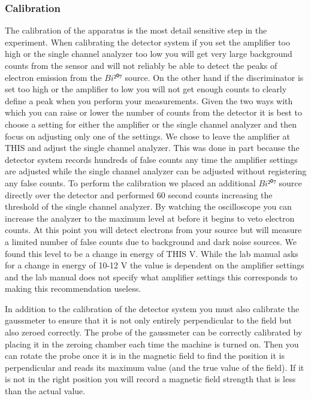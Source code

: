 \subsubsection{Calibration}
The calibration of the apparatus is the most detail sensitive step in the experiment.  When calibrating the detector system if you set the amplifier too high or the single channel analyzer too low you will get very large background counts from the sensor and will not reliably be able to detect the peaks of electron emission from the $Bi²⁰⁷$ source.  On the other hand if the discriminator is set too high or the amplifier to low you will not get enough counts to clearly define a peak when you perform your measurements. Given the two ways with which you can raise or lower the number of counts from the detector it is best to choose a setting for either the amplifier or the single channel analyzer and then focus on adjusting only one of the settings.  We chose to leave the amplifier at THIS and adjust the single channel analyzer.  This was done in part because the detector system records hundreds of false counts any time the amplifier settings are adjusted while the single channel analyzer can be adjusted without registering any false counts. To perform the calibration we placed an additional $Bi²⁰⁷$ source directly over the detector and performed 60 second counts increasing the threshold of the single channel analyzer. By watching the oscilloscope you can increase the analyzer to the maximum level at before it begins to veto electron counts. At this point you will detect electrons from your source but will measure a limited number of false counts due to background and dark noise sources.  We found this level to be a change in energy of THIS V.  While the lab manual asks for a change in energy of 10-12 V the value is dependent on the amplifier settings and the lab manual does not specify what amplifier settings this corresponds to making this recommendation useless.

In addition to the calibration of the detector system you must also calibrate the gaussmeter to ensure that it is not only entirely perpendicular to the field but also zeroed correctly.  The probe of the gaussmeter can be correctly calibrated by placing it in the zeroing chamber each time the machine is turned on. Then you can rotate the probe once it is in the magnetic field to find the position it is perpendicular and reads its maximum value (and the true value of the field). If it is not in the right position you will record a magnetic field strength that is less than the actual value.  

